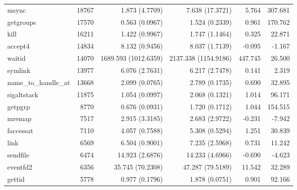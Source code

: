 \begin{longtable}{>{\ttfamily}lrrrrr}
                          msync &      18767 &              1.873 (4.7709) &           7.638 (17.3721) &           5.764 &      307.681 \\
                      getgroups &      17570 &              0.563 (0.0967) &            1.524 (0.2339) &           0.961 &      170.762 \\
                           kill &      16211 &              1.422 (0.9967) &            1.747 (1.1464) &           0.325 &       22.871 \\
                        accept4 &      14834 &              8.132 (0.9456) &            8.037 (1.7139) &          -0.095 &       -1.167 \\
                         waitid &      14070 &        1689.593 (1012.6359) &      2137.338 (1154.9186) &         447.745 &       26.500 \\
                        symlink &      13977 &              6.076 (2.7631) &            6.217 (2.7478) &           0.141 &        2.319 \\
           name\_to\_handle\_at &      13668 &              2.099 (0.0765) &            2.789 (0.1735) &           0.690 &       32.895 \\
                    sigaltstack &      11875 &              1.054 (0.0997) &            2.068 (0.1321) &           1.014 &       96.171 \\
                        getpgrp &       8770 &              0.676 (0.0931) &            1.720 (0.1712) &           1.044 &      154.515 \\
                         mremap &       7517 &              2.915 (3.3185) &            2.683 (2.9722) &          -0.231 &       -7.942 \\
                      faccessat &       7110 &              4.057 (0.7588) &            5.308 (0.5294) &           1.251 &       30.839 \\
                           link &       6569 &              6.504 (0.9001) &            7.235 (2.5968) &           0.731 &       11.242 \\
                       sendfile &       6474 &             14.923 (2.6876) &           14.233 (4.6966) &          -0.690 &       -4.623 \\
                       eventfd2 &       6356 &            35.745 (70.2308) &          47.287 (79.5189) &          11.542 &       32.289 \\
                         gettid &       5778 &              0.977 (0.1796) &            1.878 (0.0751) &           0.901 &       92.166 \\

\end{longtable}
